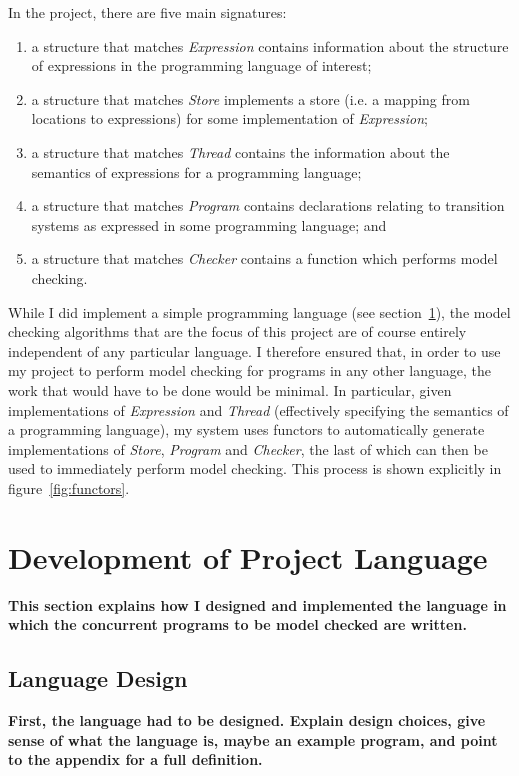 \documentclass[12pt,a4paper,twoside,openright]{report}
\begin{document}
In the project, there are five main signatures:
\begin{enumerate}
	\item a structure that matches \emph{Expression}
	contains information about the structure of expressions
	in the programming language of interest;
	\item a structure that matches \emph{Store}
	implements a store (i.e. a mapping from locations
	to expressions) for some implementation of \emph{Expression};
	\item a structure that matches \emph{Thread} contains
	the information about the semantics of expressions
	for a programming language;
	\item a structure that matches \emph{Program}
	contains declarations relating to
	transition systems as expressed in some programming
	language; and
	\item a structure that matches \emph{Checker}
	contains a function which performs model checking.
\end{enumerate}

While I did implement a simple programming language
(see section~\ref{sec:language}), the model checking
algorithms that are the focus of this project are of
course entirely independent of any particular language.
I therefore ensured that, in order to use
my project to perform model checking for programs
in any other language, the work that would have to
be done would be minimal. In particular, given implementations
of \emph{Expression} and \emph{Thread} (effectively
specifying the semantics of a programming language), my system uses
functors to automatically generate implementations of
\emph{Store}, \emph{Program} and \emph{Checker}, the
last of which can then be used to immediately perform
model checking. This process is shown explicitly in
figure~\ref{fig:functors}.

\section{Development of Project Language}\label{sec:language}
\textbf{This section explains how I designed
	and implemented the language in which the
	concurrent programs to be model checked
	are written.}

\subsection{Language Design}
\textbf{First, the language had to be designed.
	Explain design choices, give sense of what
	the language is, maybe an example program,
	and point to the appendix for a full definition.}
\end{document}
